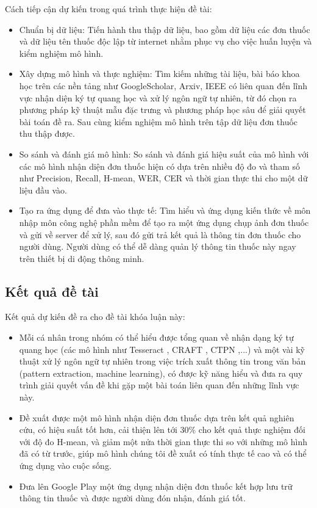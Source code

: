  Cách tiếp cận dự kiến trong quá trình thực hiện đề tài:
    \begin{itemize}
        \item Chuẩn bị dữ liệu: Tiến hành thu thập dữ liệu, bao gồm dữ liệu các đơn thuốc và dữ liệu tên thuốc độc lập từ internet nhằm phục vụ cho việc huấn luyện và kiểm nghiệm mô hình.
        \item Xây dựng mô hình và thực nghiệm: Tìm kiếm những tài liệu, bài báo khoa học trên các nền tảng như GoogleScholar, Arxiv, IEEE có liên quan đến lĩnh vực nhận diện ký tự quang học và xử lý ngôn ngữ tự nhiên, từ đó chọn ra phương pháp kỹ thuật mẫu đặc trưng và phương pháp học sâu để giải quyết bài toán đề ra. Sau cùng kiểm nghiệm mô hình trên tập dữ liệu đơn thuốc thu thập được.
        \item So sánh và đánh giá mô hình: So sánh và đánh giá hiệu suất của mô hình với các mô hình nhận diện đơn thuốc hiện có dựa trên nhiều độ đo và tham số như Precision, Recall, H-mean, WER, CER và thời gian thực thi cho một dữ liệu đầu vào.
        \item Tạo ra ứng dụng để đưa vào thực tế: Tìm hiểu và ứng dụng kiến thức về môn nhập môn công nghệ phần mềm để tạo ra một ứng dụng chụp ảnh đơn thuốc và gửi về server để xử lý, sau đó gửi trả kết quả là thông tin đơn thuốc cho người dùng. Người dùng có thể dễ dàng quản lý thông tin thuốc này ngay trên thiết bị di động thông minh.
    \end{itemize}

\subsection*{Kết quả đề tài}

Kết quả dự kiến đề ra cho đề tài khóa luận này:
    \begin{itemize}
        \item Mỗi cá nhân trong nhóm có thể hiểu được tổng quan về nhận dạng ký tự quang học (các mô hình như Tesseract \cite{smith2007overview}, CRAFT \cite{baek2019character}, CTPN \cite{tian2016detecting},...) và một vài kỹ thuật xử lý ngôn ngữ tự nhiên trong việc trích xuất thông tin trong văn bản (pattern extraction, machine learning), có được kỹ năng hiểu và đưa ra quy trình giải quyết vấn đề khi gặp một bài toán liên quan đến những lĩnh vực này.
        \item Đề xuất được một mô hình nhận diện đơn thuốc dựa trên kết quả nghiên cứu, có hiệu suất tốt hơn, cải thiện lên tới 30\% cho kết quả thực nghiệm đối với độ đo H-mean, và giảm một nửa thời gian thực thi so với những mô hình đã có từ trước, giúp mô hình chúng tôi đề xuất có tính thực tế cao và có thể ứng dụng vào cuộc sống.
        \item Đưa lên Google Play một ứng dụng nhận diện đơn thuốc kết hợp lưu trữ thông tin thuốc và được người dùng đón nhận, đánh giá tốt.
    \end{itemize}

